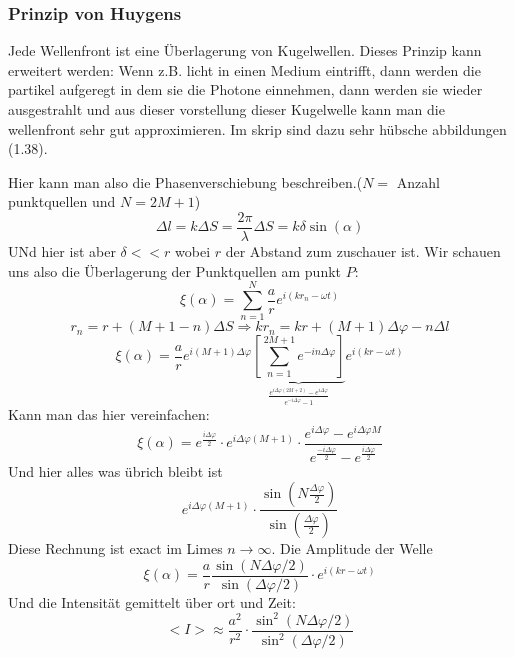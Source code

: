 \documentclass{article}
\begin{document}
\subsubsection{Prinzip von Huygens} Jede Wellenfront ist eine Überlagerung von Kugelwellen. Dieses Prinzip kann erweitert werden: \newline
Wenn z.B. licht in einen Medium eintrifft, dann werden die partikel aufgeregt in dem sie die Photone einnehmen, dann werden sie wieder ausgestrahlt und aus dieser vorstellung dieser Kugelwelle kann man die wellenfront sehr gut approximieren. Im skrip sind dazu sehr hübsche abbildungen (1.38).
\newline\begin{center}\end{center} Hier kann man also die Phasenverschiebung beschreiben.($N=$ Anzahl punktquellen und $N=2M+1$) \[\Delta l =k\Delta S = \frac{2\pi}{\lambda}\Delta S=k\delta \sin(\alpha)\] UNd hier ist aber $\delta << r$ wobei $r$ der Abstand zum zuschauer ist.
Wir schauen uns also die Überlagerung der Punktquellen am punkt $P$:\[\xi(\alpha)=\sum_{n=1}^N \frac{a}{r} e^{i(kr_n-\omega t)}\]\[r_n=r+(M+1-n)\Delta S \Rightarrow kr_n=k r+(M+1)\Delta \varphi-n\Delta l\]
\[\xi(\alpha)=\frac{a}{r}e^{i(M+1)\Delta \varphi}\underset{\frac{e^{i\Delta\varphi(2M+2)}-e^{i\Delta\varphi}}{e^{-i\Delta\varphi}-1}}{\underbrace{\left[\sum_{n=1}^{2M+1}e^{-in\Delta \varphi}\right]}}e^{i(kr-\omega t)}\]
Kann man das hier vereinfachen:\[\xi(\alpha)=e^{\frac{i\Delta \varphi}{2}}\cdot e^{i\Delta\varphi(M+1)}\cdot\frac{e^{i\Delta\varphi}-e^{i\Delta\varphi M}}{e^{\frac{-i\Delta \varphi}{2}}-e^{\frac{i\Delta \varphi}{2}}}\]
Und hier alles was übrich bleibt ist \[e^{i\Delta \varphi(M+1)}\cdot\frac{\sin(N\frac{\Delta\varphi}{2})}{\sin(\frac{\Delta\varphi}{2})}\]
Diese Rechnung ist exact im Limes $n\rightarrow \infty$. Die Amplitude der Welle \[\xi(\alpha)=\frac{a}{r}\frac{\sin(N\Delta\varphi/2)}{\sin(\Delta\varphi/2)}\cdot e^{i(kr-\omega t)}\]
Und die Intensität gemittelt über ort und Zeit: \[<I>\approx\frac{a^2}{r^2}\cdot\frac{\sin^2(N\Delta \varphi/2)}{\sin^2(\Delta \varphi/2)}\]
\end{document}

